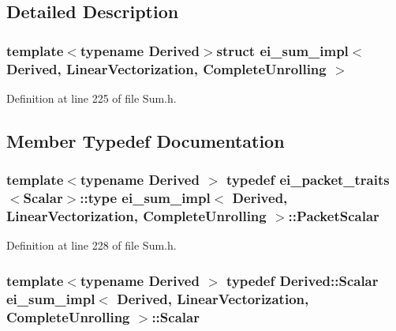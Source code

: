 \subsection{Detailed Description}
\subsubsection*{template$<$typename Derived$>$struct ei\-\_\-sum\-\_\-impl$<$ Derived, Linear\-Vectorization, Complete\-Unrolling $>$}



Definition at line 225 of file Sum.\-h.



\subsection{Member Typedef Documentation}
\hypertarget{structei__sum__impl_3_01_derived_00_01_linear_vectorization_00_01_complete_unrolling_01_4_a4a7c4604429dbd7cbbb15d05e641eb27}{
\subsubsection[{Packet\-Scalar}]{\setlength{\rightskip}{0pt plus 5cm}template$<$typename Derived $>$ typedef {\bf ei\-\_\-packet\-\_\-traits}$<${\bf Scalar}$>$\-::{\bf type} {\bf ei\-\_\-sum\-\_\-impl}$<$ Derived, {\bf Linear\-Vectorization}, {\bf Complete\-Unrolling} $>$\-::{\bf Packet\-Scalar}}}\label{structei__sum__impl_3_01_derived_00_01_linear_vectorization_00_01_complete_unrolling_01_4_a4a7c4604429dbd7cbbb15d05e641eb27}


Definition at line 228 of file Sum.\-h.

\hypertarget{structei__sum__impl_3_01_derived_00_01_linear_vectorization_00_01_complete_unrolling_01_4_abf2c64eca928f2db055f1014c528a8c8}{
\subsubsection[{Scalar}]{\setlength{\rightskip}{0pt plus 5cm}template$<$typename Derived $>$ typedef Derived\-::\-Scalar {\bf ei\-\_\-sum\-\_\-impl}$<$ Derived, {\bf Linear\-Vectorization}, {\bf Complete\-Unrolling} $>$\-::{\bf Scalar}}}\label{structei__sum__impl_3_01_derived_00_01_linear_vectorization_00_01_complete_unrolling_01_4_abf2c64eca928f2db055f1014c528a8c8}


